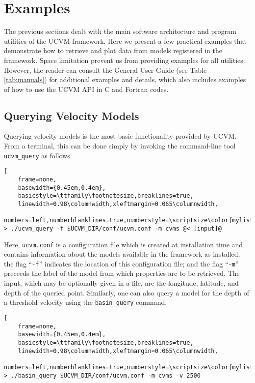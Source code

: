 
\section{Examples}

The previous sections dealt with the main software architecture and program utilities of the UCVM framework. Here we present a few practical examples that demonstrate how to retrieve and plot data from models registered in the framework. Space limitation prevent us from providing examples for all utilities. However, the reader can consult the General User Guide (see Table \ref{tab:manuals}) for additional examples and details, which also includes examples of how to use the UCVM API in C and Fortran codes.

\subsection{Querying Velocity Models}

Querying velocity models is the most basic functionality provided by UCVM. From a terminal, this can be done simply by invoking the command-line tool \texttt{ucvm\_query} as follows.

\begin{lstlisting}[
	frame=none,
	basewidth={0.45em,0.4em},
	basicstyle=\ttfamily\footnotesize,breaklines=true,
	linewidth=0.98\columnwidth,xleftmargin=0.065\columnwidth,
	numbers=left,numberblanklines=true,numberstyle=\scriptsize\color{mylistingnclr},style=optional]
> ./ucvm_query -f $UCVM_DIR/conf/ucvm.conf -m cvms @< [input]@
\end{lstlisting}

\noindent
Here, \texttt{ucvm.conf} is a configuration file which is created at installation time and contains information about the models available in the framework as installed; the flag ``\texttt{-f}'' indicates the location of this configuration file; and the flag ``\texttt{-m}'' preceeds the label of the model from which properties are to be retrieved. The input, which may be optionally given in a file, are the longitude, latitude, and depth of the queried point. Similarly, one can also query a model for the depth of a threshold velocity using the \texttt{basin\_query} command.

\begin{lstlisting}[
	frame=none,
	basewidth={0.45em,0.4em},
	basicstyle=\ttfamily\footnotesize,breaklines=true,
	linewidth=0.98\columnwidth,xleftmargin=0.065\columnwidth,
	numbers=left,numberblanklines=true,numberstyle=\scriptsize\color{mylistingnclr}]
> ./basin_query $UCVM_DIR/conf/ucvm.conf -m cvms -v 2500
\end{lstlisting}

